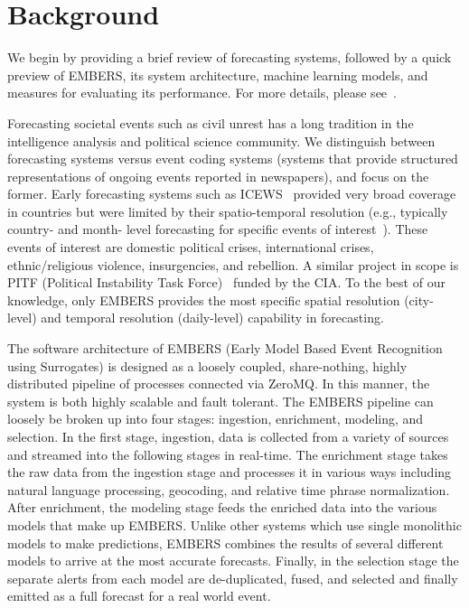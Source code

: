\section{Background}
We begin by providing a brief review of forecasting systems, followed by a
quick preview of EMBERS, its system architecture, machine learning models,
and measures for evaluating its performance. For more details, please
see~\cite{kdd:beating-the-news}.

Forecasting societal events such as civil unrest has a long tradition in the intelligence analysis and political science
community. We distinguish between forecasting systems versus event coding
systems (systems that provide
structured representations of ongoing events reported in newspapers), and focus on the former.
Early forecasting systems such as ICEWS~\cite{icews} provided very broad coverage in countries but
were limited by their spatio-temporal resolution (e.g., typically country- and month- level forecasting for
specific events of interest~\cite{eoiprediction}). These events of interest are
domestic political crises, international crises, ethnic/religious violence, insurgencies,
and rebellion.
A similar project in scope is PITF (Political Instability
Task Force)~\cite{pitf} funded by the CIA.
To the best of our knowledge, only EMBERS provides
the most specific spatial resolution (city-level) and temporal resolution (daily-level) capability in forecasting.

The software architecture of EMBERS (Early Model Based Event Recognition using
Surrogates) is designed as a loosely coupled, share-nothing, highly distributed pipeline of
processes connected via ZeroMQ.  In this manner, the system is both highly scalable and fault
tolerant.  The EMBERS pipeline can loosely be broken up into four stages:
ingestion, enrichment, modeling, and selection.  In the first stage, ingestion,
data is collected from a variety of sources and streamed into the following
stages in real-time.  The enrichment stage takes the raw data from the ingestion stage
and processes it in various ways including natural language processing,
geocoding, and relative time phrase normalization.  After enrichment, the
modeling stage feeds the enriched data into the various models that make up
EMBERS.  Unlike other systems which use single monolithic models to make
predictions, EMBERS combines the results of several different models to arrive
at the most accurate forecasts.  Finally, in the selection stage the separate
alerts from each model are de-duplicated, fused, and selected and finally
emitted as a full forecast for a real world event.

